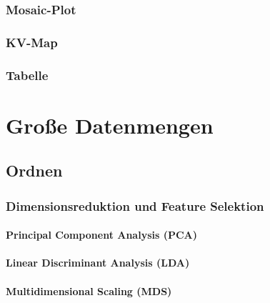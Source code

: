             \subsubsection{Mosaic-Plot} %

            \subsubsection{KV-Map} %

            \subsubsection{Tabelle} %

    \section{Große Datenmengen} %

        \subsection{Ordnen} %

            \subsubsection{Dimensionsreduktion und Feature Selektion} %

                \paragraph{Principal Component Analysis (PCA)} %

                \paragraph{Linear Discriminant Analysis (LDA)} %

                \paragraph{Multidimensional Scaling (MDS)} %

